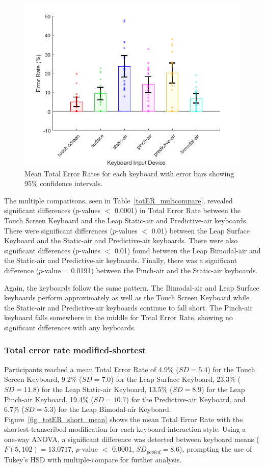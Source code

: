 \begin{figure}[!t]
	\centering
	\includegraphics{Figures/fig_totER_mean}
	\caption[Mean Total Error Rates]{Mean Total Error Rates for each keyboard with error bars showing 95\% confidence intervals.}
	\label{fig_totER_mean}
\end{figure}

The multiple comparisons, seen in Table~\ref{totER_multcompare}, revealed significant differences ($p$-values $<$ 0.0001) in Total Error Rate between the Touch Screen Keyboard and the Leap Static-air and Predictive-air keyboards. There were significant differences ($p$-values $<$ 0.01) between the Leap Surface Keyboard and the Static-air and Predictive-air keyboards. There were also significant differences ($p$-values $<$ 0.01) found between the Leap Bimodal-air and the Static-air and Predictive-air keyboards. Finally, there was a significant difference ($p$-value = 0.0191) between the Pinch-air and the Static-air keyboards.

Again, the keyboards follow the same pattern. The Bimodal-air and Leap Surface keyboards perform approximately as well as the Touch Screen Keyboard while the Static-air and Predictive-air keyboards continue to fall short. The Pinch-air keyboard falls somewhere in the middle for Total Error Rate, showing no significant differences with any keyboards.

\subsubsection{Total error rate modified-shortest}
Participants reached a mean Total Error Rate of 4.9\% ($SD = 5.4$) for the Touch Screen Keyboard, 9.2\% ($SD = 7.0$) for the Leap Surface Keyboard, 23.3\% ($SD = 11.8$) for the Leap Static-air Keyboard, 13.5\% ($SD = 8.9$) for the Leap Pinch-air Keyboard, 19.4\% ($SD = 10.7$) for the Predictive-air Keyboard, and 6.7\% ($SD = 5.3$) for the Leap Bimodal-air Keyboard. Figure~\ref{fig_totER_short_mean} shows the mean Total Error Rate with the shortest-transcribed modification for each keyboard interaction style. Using a one-way ANOVA, a significant difference was detected between keyboard means ($F(5, 102) = 13.0717$, $p$-value $<$ 0.0001, $SD_{pooled} = 8.6$), prompting the use of Tukey's HSD with multiple-compare for further analysis.

